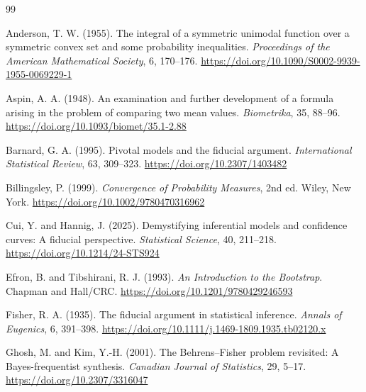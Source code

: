 \documentclass[12pt]{article}
\begin{document}
\begin{thebibliography}{99}

Anderson, T. W. (1955).
The integral of a symmetric unimodal function over a symmetric convex set and
some probability inequalities.
\emph{Proceedings of the American Mathematical Society}, 6, 170--176.
\newblock \href{https://doi.org/10.1090/S0002-9939-1955-0069229-1}{https://doi.org/10.1090/S0002-9939-1955-0069229-1}

Aspin, A. A. (1948).
An examination and further development of a formula arising in the problem of
comparing two mean values.
\emph{Biometrika}, 35, 88--96.
\newblock \href{https://doi.org/10.1093/biomet/35.1-2.88}{https://doi.org/10.1093/biomet/35.1-2.88}

Barnard, G. A. (1995).
Pivotal models and the fiducial argument.
\emph{International Statistical Review}, 63, 309--323.
\newblock \href{https://doi.org/10.2307/1403482}{https://doi.org/10.2307/1403482}

Billingsley, P. (1999).
\emph{Convergence of Probability Measures}, 2nd ed.
Wiley, New York.
\newblock \href{https://doi.org/10.1002/9780470316962}{https://doi.org/10.1002/9780470316962}

Cui, Y. and Hannig, J. (2025).
Demystifying inferential models and confidence curves: A fiducial perspective.
\emph{Statistical Science}, 40, 211--218.
\newblock \href{https://doi.org/10.1214/24-STS924}{https://doi.org/10.1214/24-STS924}

Efron, B. and Tibshirani, R. J. (1993).
\emph{An Introduction to the Bootstrap}.
Chapman and Hall/CRC.
\newblock \href{https://doi.org/10.1201/9780429246593}{https://doi.org/10.1201/9780429246593}

Fisher, R. A. (1935).
The fiducial argument in statistical inference.
\emph{Annals of Eugenics}, 6, 391--398.
\newblock \href{https://doi.org/10.1111/j.1469-1809.1935.tb02120.x}{https://doi.org/10.1111/j.1469-1809.1935.tb02120.x}

Ghosh, M. and Kim, Y.-H. (2001).
The Behrens--Fisher problem revisited: A Bayes-frequentist synthesis.
\emph{Canadian Journal of Statistics}, 29, 5--17.
\newblock \href{https://doi.org/10.2307/3316047}{https://doi.org/10.2307/3316047}


\end{thebibliography}
\end{document}

